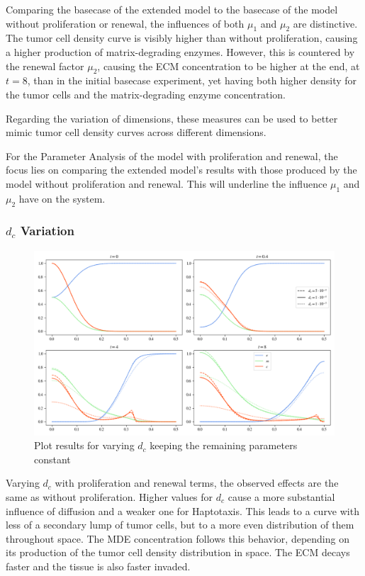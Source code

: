 Comparing the basecase of the extended model to the basecase of the model without proliferation or renewal, the influences of both $\mu_1$ and $\mu_2$ are distinctive. The tumor cell density curve is visibly higher than without proliferation, causing a higher production of matrix-degrading enzymes. However, this is countered by the renewal factor $\mu_2$, causing the ECM concentration to be higher at the end, at $t=8$, than in the initial basecase experiment, yet having both higher density for the tumor cells and the matrix-degrading enzyme concentration.

Regarding the variation of dimensions, these measures can be used to better mimic tumor cell density curves across different dimensions.

For the Parameter Analysis of the model with proliferation and renewal, the focus lies on comparing the extended model's results with those produced by the model without proliferation and renewal. This will underline the influence $\mu_1$ and $\mu_2$ have on the system.

\subsubsection*{$d_c$ Variation}
\begin{figure}[h!]
    \centering
    \includegraphics[width=\textwidth]{resources/images/prolif_dc_variation.png}
    \caption{Plot results for varying $d_c$ keeping the remaining parameters constant}
    \label{fig:prolif_dc_comparison}
\end{figure}

Varying $d_c$ with proliferation and renewal terms, the observed effects are the same as without proliferation. Higher values for $d_c$ cause a more substantial influence of diffusion and a weaker one for Haptotaxis. This leads to a curve with less of a secondary lump of tumor cells, but to a more even distribution of them throughout space. The MDE concentration follows this behavior, depending on its production of the tumor cell density distribution in space. The ECM decays faster and the tissue is also faster invaded. 

